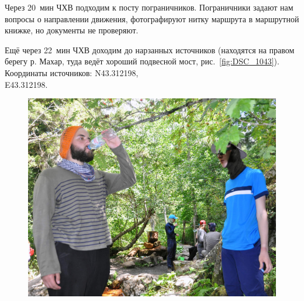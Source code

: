 Через 20~мин ЧХВ подходим к посту пограничников. Пограничники задают нам вопросы о направлении движения, фотографируют нитку маршрута в маршрутной книжке, но документы не проверяют.

Ещё через 22~мин ЧХВ доходим до нарзанных источников (находятся на правом берегу р. Махар, туда ведёт хороший подвесной мост, рис.~\ref{fig:DSC_1043}). Координаты источников: N43.312198\degree,\\E43.312198\degree.

\begin{figure}[h!]
	\centering
	\begin{minipage}[h]{0.62\linewidth}
		\includegraphics[width=\linewidth]{../pics/DSC_1043.jpg}
	\end{minipage}
	\quad
	\begin{minipage}[h]{0.35\linewidth}

\end{minipage}
\end{figure}
